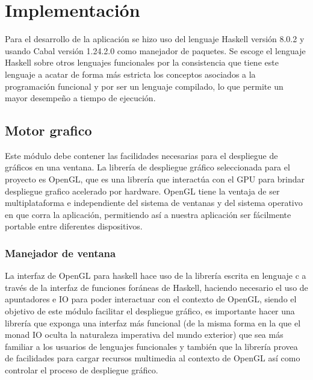 
\setcounter{secnumdepth}{4}

\chapter{Implementación}  %
\label{capitulo4}

\graphicspath{{implementacion/Figs/Vector/}{implementacion/Figs/}}

Para el desarrollo de la aplicación se hizo uso del lenguaje Haskell versión 8.0.2 y usando Cabal versión 1.24.2.0 como manejador de paquetes. Se escoge el lenguaje Haskell sobre otros lenguajes funcionales por la consistencia que tiene este lenguaje a acatar de forma más estricta los conceptos asociados a la programación funcional y por ser un lenguaje compilado, lo que permite un mayor desempeño a tiempo de ejecución.

\section{Motor grafico}

Este módulo debe contener las facilidades necesarias para el despliegue de gráficos en una ventana. La librería de despliegue gráfico seleccionada para el proyecto es OpenGL, que es una librería que interactúa con el GPU para brindar despliegue grafico acelerado por hardware. OpenGL tiene la ventaja de ser multiplataforma e independiente del sistema de ventanas y del sistema operativo en que corra la aplicación, permitiendo así a nuestra aplicación ser fácilmente portable entre diferentes dispositivos.

\subsection{Manejador de ventana}

La interfaz de OpenGL para haskell hace uso de la librería escrita en lenguaje c a través de la interfaz de funciones foráneas de Haskell, haciendo necesario el uso de apuntadores e IO para poder interactuar con el contexto de OpenGL, siendo el objetivo de este módulo facilitar el despliegue gráfico, es importante hacer una librería que exponga una interfaz más funcional (de la misma forma en la que el monad IO oculta la naturaleza imperativa del mundo exterior) que sea más familiar a los usuarios de lenguajes funcionales y también que la librería provea de facilidades para cargar recursos multimedia al contexto de OpenGL así como controlar el proceso de despliegue gráfico.

